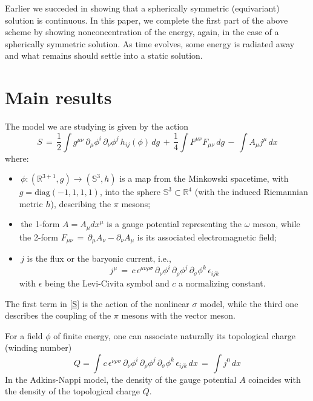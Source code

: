 \documentclass{amsart}
\begin{document}
Earlier \cite{GR1} we succeded in showing that a spherically symmetric (equivariant) solution is continuous. In this paper, we complete the first part of the above scheme by showing nonconcentration of the energy, again, in the case of a spherically symmetric  solution. As time evolves, some energy is radiated away and what remains should settle into a static solution.

\section{Main results}

The model we are studying is given by the action
\begin{equation}
S\,=\,\frac 12 \int  g^{\mu\nu} \,\partial_\mu\phi^i\, \partial_\nu\phi^j\,
h_{ij}(\phi)\,dg\,+\, \frac{1}{4} \int F^{\mu\nu} F_{\mu\nu}\,dg\,-\, \int A_\mu j^\mu \, dx
\label{S}
\end{equation}
where:
\begin{itemize}

\item \,$\phi :(\mathbb{R}^{3+1},g)\to(\mathbb{S}^3,h)$ is a map from
the Minkowski spacetime, with $g= \text{diag}(-1,1,1,1)$, into
the sphere $\mathbb{S}^3\subset\mathbb{R}^{4} $ (with the
induced Riemannian metric $h$), describing the $\pi$ mesons;

\item \,the 1-form $A=A_\mu dx^\mu$ is a gauge potential representing the $\omega$ meson, while the 2-form
$F_{\mu\nu}\,=\,\partial_\mu A_\nu -
\partial_\nu A_\mu$ is its associated electromagnetic field;

\item \,$j$ is the flux or the baryonic current, i.e.,
\[
j^\mu\,=\,c\, \epsilon^{\mu\nu\rho\sigma}\,
\partial_\nu\phi^i \,\partial_\rho\phi^j \,\partial_\sigma\phi^k
\,\epsilon_{ijk}
\]
with $\epsilon$ being the Levi-Civita symbol and $c$ a normalizing constant.
\end{itemize}

The first term in \eqref{S} is the action of the nonlinear $\sigma$ model, while the third one describes the coupling of the $\pi$ mesons with the vector meson.

For a field $\phi$ of finite energy, one can associate naturally its topological charge (winding number)
\begin{equation}
Q=\int c\, \epsilon^{\nu\rho\sigma}\,
\partial_\nu\phi^i \,\partial_\rho\phi^j \,\partial_\sigma\phi^k
\,\epsilon_{ijk}\,dx\,=\,\int j^0 \,dx \label{Q}
\end{equation}
In the Adkins-Nappi model, the density of the gauge potential $A$ coincides with the density of the topological charge $Q$.
\end{document}
